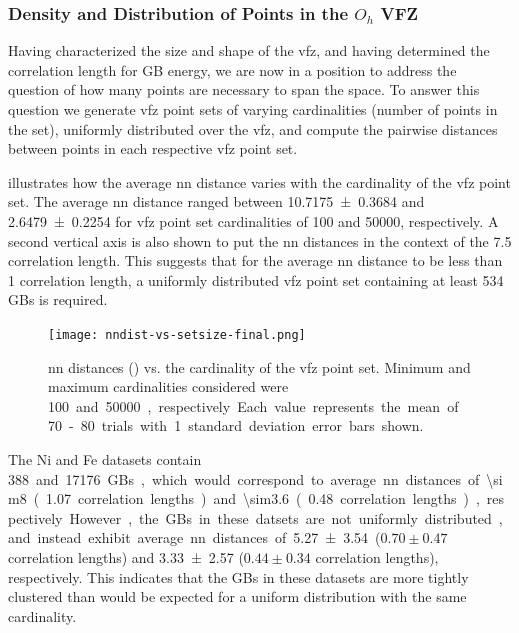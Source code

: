 \documentclass[final,twocolumn,12pt]{elsarticle}
\begin{document}
	\subsubsection{Density and Distribution of Points in the $O_h$ VFZ} \label{sec:results:density}
	
	Having characterized the size and shape of the \gls{vfz}, and having determined the correlation length for GB energy, we are now in a position to address the question of how many points are necessary to span the space. To answer this question we generate \gls{vfz} point sets of varying cardinalities (number of points in the set), uniformly distributed over the \gls{vfz}, and compute the pairwise distances between points in each respective \gls{vfz} point set.
	
	 illustrates how the average \gls{nn} distance varies with the cardinality of the \gls{vfz} point set. The average \gls{nn} distance ranged between \SI{10.7175 \pm 0.3684}{\tobydeg} and \SI{2.6479 \pm 0.2254}{\tobydeg} for \gls{vfz} point set cardinalities of \num{100} and \num{50000}, respectively. A second vertical axis is also shown to put the \gls{nn} distances in the context of the \SI{7.5}{\tobydeg} correlation length. This suggests that for the average \gls{nn} distance to be less than 1 correlation length, a uniformly distributed \gls{vfz} point set containing at least 534 GBs is required.
	\begin{figure}
		\centering
		\texttt{[image: nndist-vs-setsize-final.png]}
		\caption{\Gls{nn} distances (\SI{}{\tobydeg}) vs. the cardinality of the \gls{vfz} point set. Minimum and maximum cardinalities considered were \SI{100} and \SI{50000}, respectively. Each value represents the mean of 70-80 trials with 1 standard deviation error bars shown.}
		\label{fig:nndist-vs-setsize}
	\end{figure}
	
	The Ni and Fe datasets contain \SI{388} and \SI{17176} GBs, which would correspond to average \gls{nn} distances of \SI{\sim8}{\tobydeg} (\SI{1.07} correlation lengths) and \SI{\sim3.6}{\tobydeg} (\SI{0.48} correlation lengths), respectively. However, the GBs in these datsets are not uniformly distributed, and instead exhibit average \gls{nn} distances of \SI{5.27\pm3.54}{\tobydeg} ($0.70\pm0.47$ correlation lengths) and \SI{3.33\pm2.57}{\tobydeg} ($0.44\pm0.34$ correlation lengths), respectively. This indicates that the GBs in these datasets are more tightly clustered than would be expected for a uniform distribution with the same cardinality.
	
\end{document}
